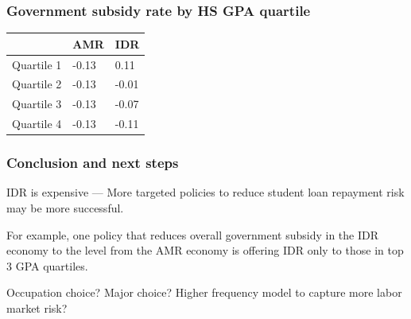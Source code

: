 \documentclass[10pt]{beamer}
\begin{document}
  \begin{frame} \frametitle{Government subsidy rate by HS GPA quartile}

    \begin{table}[H]
      \begin{tabular}{lll}
        \toprule
        & \textbf{AMR} & \textbf{IDR} \\
        \midrule
        Quartile 1 & -0.13 & 0.11 \\
        Quartile 2 & -0.13 & -0.01 \\
        Quartile 3 & -0.13 & -0.07 \\
        Quartile 4 & -0.13 & -0.11 \\
        \bottomrule
      \end{tabular}
    \end{table}

  \end{frame}

  \begin{frame} \frametitle{Conclusion and next steps}

    IDR is expensive --- More targeted policies to reduce student loan repayment risk may be more
    successful.

    For example, one policy that reduces overall government subsidy in the IDR economy to the level
    from the AMR economy is offering IDR only to those in top 3 GPA quartiles.

    \vspace{0.5cm}

    Occupation choice? Major choice? Higher frequency model to capture more labor market risk?

  \end{frame}
\end{document}
